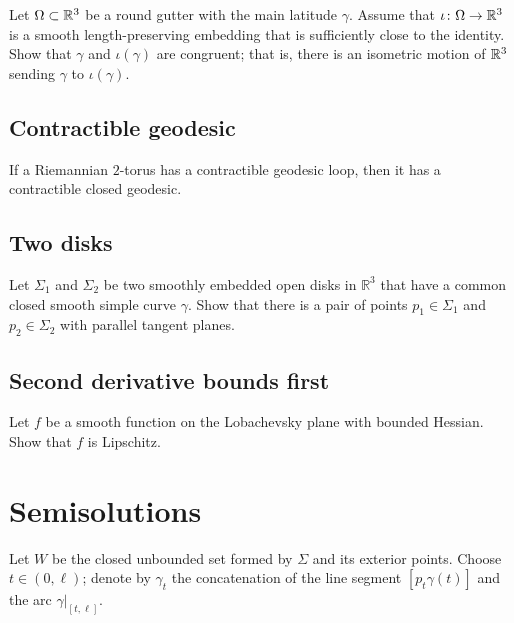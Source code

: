 \begin{pr}
Let $\Omega\subset \mathbb{R}^3$ be a round gutter with the main latitude $\gamma$.
Assume that $\iota\:\Omega\z\to\RR^3$ 
is a smooth length-preserving embedding that is sufficiently close to the identity.
Show that $\gamma$ and $\iota(\gamma)$ are congruent;
that is, there is an isometric motion of $\mathbb{R}^3$ sending $\gamma$ to $\iota(\gamma)$.
\end{pr}



\subsection*{Contractible geodesic}
\label{torus}

\begin{pr}
If a Riemannian $2$-torus has a contractible geodesic loop,
then it has a contractible closed geodesic.
\end{pr}

\subsection*{Two disks}
\label{Two disks}

\begin{pr}
Let $\Sigma_1$ and $\Sigma_2$ be two smoothly embedded open disks in $\mathbb R^3$ 
that have a common closed smooth simple curve $\gamma$.
Show that there is a pair of points  $p_1\in \Sigma_1$ and $p_2\in \Sigma_2$ with parallel tangent planes.
\end{pr}

\subsection*{Second derivative bounds first\easy}
\label{Second derivative bounds first}

\begin{pr}
Let $f$ be a smooth function on the Lobachevsky plane with bounded Hessian.
Show that $f$ is Lipschitz.
\end{pr}


\section*{Semisolutions}
Let $W$ be the closed unbounded set formed by $\Sigma$ and its exterior points.
Choose $t\in (0,\ell)$;
denote by $\gamma_t$ the concatenation of the line segment $[p_t\gamma(t)]$ and the arc $\gamma|_{[t,\ell]}$.

